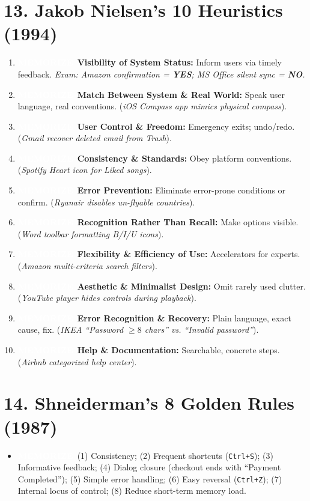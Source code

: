 \documentclass[8.5pt,a4paper,twocolumn]{article}
\newcommand{\tagmem}{\colorbox{accentred}{\textcolor{white}{\bfseries\fontsize{5.5pt}{6.5pt}\selectfont MEMORIZE}}\ }
\begin{document}
\section*{13. Jakob Nielsen's 10 Heuristics (1994)}
\begin{enumerate}[leftmargin=8pt, itemsep=1pt, topsep=0.5pt]
    \item \tagmem \textbf{Visibility of System Status:} Inform users via timely feedback.  
    \textit{Exam: Amazon confirmation = \textbf{YES}; MS Office silent sync = \textbf{NO}.}
    \item \tagmem \textbf{Match Between System \& Real World:} Speak user language, real conventions. (\textit{iOS Compass app mimics physical compass}).
    \item \tagmem \textbf{User Control \& Freedom:} Emergency exits; undo/redo. (\textit{Gmail recover deleted email from Trash}).
    \item \tagmem \textbf{Consistency \& Standards:} Obey platform conventions. (\textit{Spotify Heart icon for Liked songs}).
    \item \tagmem \textbf{Error Prevention:} Eliminate error-prone conditions or confirm. (\textit{Ryanair disables un-flyable countries}).
    \item \tagmem \textbf{Recognition Rather Than Recall:} Make options visible. (\textit{Word toolbar formatting B/I/U icons}).
    \item \tagmem \textbf{Flexibility \& Efficiency of Use:} Accelerators for experts. (\textit{Amazon multi-criteria search filters}).
    \item \tagmem \textbf{Aesthetic \& Minimalist Design:} Omit rarely used clutter. (\textit{YouTube player hides controls during playback}).
    \item \tagmem \textbf{Error Recognition \& Recovery:} Plain language, exact cause, fix. (\textit{IKEA ``Password $\ge 8$ chars'' vs. ``Invalid password''}).
    \item \tagmem \textbf{Help \& Documentation:} Searchable, concrete steps. (\textit{Airbnb categorized help center}).
\end{enumerate}

\section*{14. Shneiderman's 8 Golden Rules (1987)}
\begin{itemize}[leftmargin=7pt, itemsep=0.5pt, topsep=0.5pt]
    \item \tagmem (1) Consistency; (2) Frequent shortcuts (\texttt{Ctrl+S}); (3) Informative feedback; (4) Dialog closure (checkout ends with ``Payment Completed''); (5) Simple error handling; (6) Easy reversal (\texttt{Ctrl+Z}); (7) Internal locus of control; (8) Reduce short-term memory load.
\end{itemize}
\end{document}
